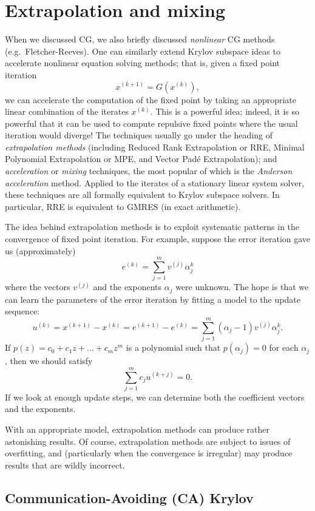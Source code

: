 \documentclass[12pt, leqno]{article} %
\begin{document}
\section{Extrapolation and mixing}

When we discussed CG, we also briefly discussed {\em nonlinear} CG
methods (e.g.~Fletcher-Reeves).  One can similarly extend Krylov
subspace ideas to accelerate nonlinear equation solving methods;
that is, given a fixed point iteration
\[
  x^{(k+1)} = G(x^{(k)}),
\]
we can accelerate the computation of the fixed point by taking an
appropriate linear combination of the iterates $x^{(k)}$.  This is
a powerful idea; indeed, it is so powerful that it can be used to
compute repulsive fixed points where the usual iteration would
diverge!  The techniques usually go under the heading of
{\em extrapolation methods} (including Reduced Rank Extrapolation or RRE,
Minimal Polynomial Extrapolation or MPE, and Vector Pad\'e Extrapolation);
and {\em acceleration} or {\em mixing} techniques, the most popular of
which is the {\em Anderson acceleration} method.  Applied to the iterates
of a stationary linear system solver, these techniques are all formally
equivalent to Krylov subspace solvers.  In particular, RRE is equivalent
to GMRES (in exact arithmetic).

The idea behind extrapolation methods is to exploit systematic patterns
in the convergence of fixed point iteration.  For example, suppose the
error iteration gave us (approximately)
\[
  e^{(k)} = \sum_{j=1}^m v^{(j)} \alpha_j^k
\]
where the vectors $v^{(j)}$ and the exponents $\alpha_j$ were unknown.
The hope is that we can learn the parameters of the error iteration
by fitting a model to the update sequence:
\[
  u^{(k)} = x^{(k+1)}-x^{(k)} = e^{(k+1)}-e^{(k)} =
  \sum_{j=1}^m (\alpha_j-1) v^{(j)} \alpha_j^k.
\]
If $p(z) = c_0 + c_1 z + \ldots + c_m z^m$ is a polynomial such
that $p(\alpha_j) = 0$ for each $\alpha_j$, then we should satisfy
\[
  \sum_{j=1}^m c_j u^{(k+j)} = 0.
\]
If we look at enough update steps, we can determine both the
coefficient vectors and the exponents.

With an appropriate model, extrapolation methods can produce rather
astonishing results.  Of course, extrapolation methods are subject
to issues of overfitting, and (particularly when the convergence is
irregular) may produce results that are wildly incorrect.

\subsection{Communication-Avoiding (CA) Krylov}
\end{document}
